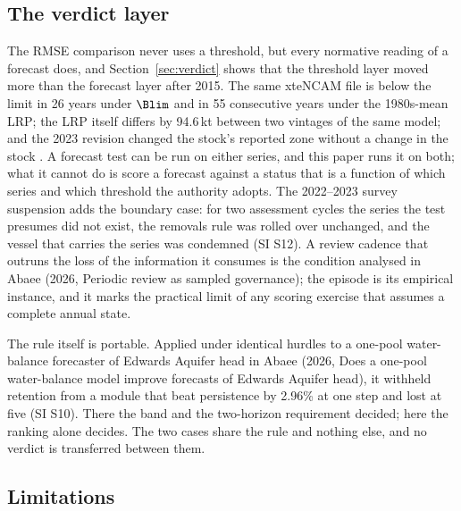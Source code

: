 \subsection{The verdict layer}\label{sec:verdictlayer}

The RMSE comparison never uses a threshold, but every normative reading of a forecast does, and Section~\ref{sec:verdict} shows that the threshold layer moved more than the forecast layer after 2015. The same xteNCAM file is below the limit in 26 years under $\Blim$ and in 55 consecutive years under the 1980s-mean LRP; the LRP itself differs by 94.6\,kt between two vintages of the same model; and the 2023 revision changed the stock's reported zone without a change in the stock \citep{DFO2024a,Regular2025}. A forecast test can be run on either series, and this paper runs it on both; what it cannot do is score a forecast against a status that is a function of which series and which threshold the authority adopts. The 2022--2023 survey suspension adds the boundary case: for two assessment cycles the series the test presumes did not exist, the removals rule was rolled over unchanged, and the vessel that carries the series was condemned (SI S12). A review cadence that outruns the loss of the information it consumes is the condition analysed in Abaee (2026, Periodic review as sampled governance); the episode is its empirical instance, and it marks the practical limit of any scoring exercise that assumes a complete annual state.

The rule itself is portable. Applied under identical hurdles to a one-pool water-balance forecaster of Edwards Aquifer head in Abaee (2026, Does a one-pool water-balance model improve forecasts of Edwards Aquifer head), it withheld retention from a module that beat persistence by 2.96\% at one step and lost at five (SI S10). There the band and the two-horizon requirement decided; here the ranking alone decides. The two cases share the rule and nothing else, and no verdict is transferred between them.

\subsection{Limitations}\label{sec:limits}

